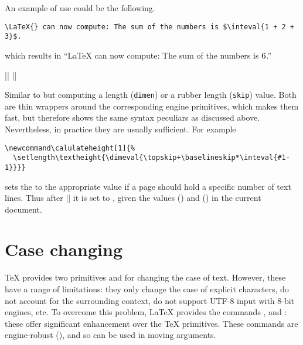\documentclass{ltxguide}
\begin{document}
An example of use could be the following.
\begin{verbatim}
\LaTeX{} can now compute: The sum of the numbers is $\inteval{1 + 2 + 3}$.
\end{verbatim}
which results in
\enquote{\LaTeX{} can now compute: The sum of the numbers is $\inteval{1 + 2 + 3}$.}


\begin{decl}
  |\dimeval|  \qquad
  |\skipeval| 
\end{decl}

Similar to  but computing a length (\texttt{dimen}) or a
rubber length (\texttt{skip}) value. Both are thin wrappers around
the corresponding engine primitives, which makes them fast, but
therefore shows the same syntax peculiars as discussed
above. Nevertheless, in practice they are usually sufficient.  For
example
\begin{verbatim}
\newcommand\calulateheight[1]{%
  \setlength\textheight{\dimeval{\topskip+\baselineskip*\inteval{#1-1}}}}
\end{verbatim}
sets the  to the appropriate value if a page should
hold a specific number of text lines. Thus after ||
it is set to , given
the values  (\dimeval{\topskip}) and 
(\dimeval{\baselineskip}) in the current document.

\section{Case changing}

\TeX{} provides two primitives  and  for changing
the case of text. However, these have a range of limitations: they only change
the case of explicit characters, do not account for the surrounding context, do
not support UTF-8 input with 8-bit engines, etc. To overcome this problem,
\LaTeX{} provides the commands ,  and
: these offer significant enhancement over the \TeX{}
primitives. These commands are engine-robust (), and so
can be used in moving arguments.
\end{document}
